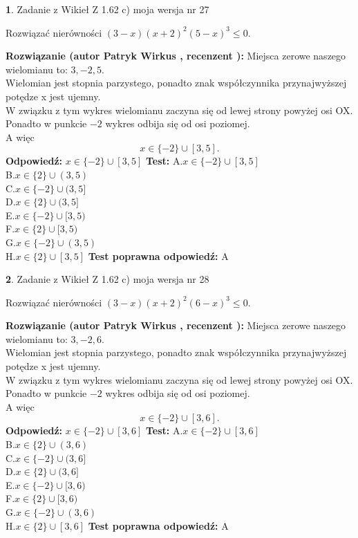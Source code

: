 \documentclass[12pt, a4paper]{article}
\theoremstyle{definition} %
\newtheorem{zad}{}
\newcommand{\zadStart}[1]{\begin{zad}#1\newline}
\newcommand{\zadStop}{\end{zad}}
\newcommand{\rozwStart}[2]{\noindent \textbf{Rozwiązanie (autor #1 , recenzent #2): }\newline}
\newcommand{\rozwStop}{\newline}
\newcommand{\odpStart}{\noindent \textbf{Odpowiedź:}\newline}
\newcommand{\odpStop}{\newline}
\newcommand{\testStart}{\noindent \textbf{Test:}\newline}
\newcommand{\testStop}{\newline}
\newcommand{\kluczStart}{\noindent \textbf{Test poprawna odpowiedź:}\newline}
\newcommand{\kluczStop}{\newline}
\begin{document}
\zadStart{Zadanie z Wikieł Z 1.62 c) moja wersja nr 27}

Rozwiązać nierówności $(3-x)(x+2)^{2}(5-x)^{3}\le0$.
\zadStop
\rozwStart{Patryk Wirkus}{}
Miejsca zerowe naszego wielomianu to: $3, -2, 5$.\\
Wielomian jest stopnia parzystego, ponadto znak współczynnika przy\linebreak najwyższej potędze x jest ujemny.\\ W związku z tym wykres wielomianu zaczyna się od lewej strony powyżej osi OX.\\
Ponadto w punkcie $-2$ wykres odbija się od osi poziomej.\\
A więc $$x \in \{-2\} \cup [3,5].$$
\rozwStop
\odpStart
$x \in \{-2\} \cup [3,5]$
\odpStop
\testStart
A.$x \in \{-2\} \cup [3,5]$\\
B.$x \in \{2\} \cup (3,5)$\\
C.$x \in \{-2\} \cup (3,5]$\\
D.$x \in \{2\} \cup (3,5]$\\
E.$x \in \{-2\} \cup [3,5)$\\
F.$x \in \{2\} \cup [3,5)$\\
G.$x \in \{-2\} \cup (3,5)$\\
H.$x \in \{2\} \cup [3,5]$
\testStop
\kluczStart
A
\kluczStop



\zadStart{Zadanie z Wikieł Z 1.62 c) moja wersja nr 28}

Rozwiązać nierówności $(3-x)(x+2)^{2}(6-x)^{3}\le0$.
\zadStop
\rozwStart{Patryk Wirkus}{}
Miejsca zerowe naszego wielomianu to: $3, -2, 6$.\\
Wielomian jest stopnia parzystego, ponadto znak współczynnika przy\linebreak najwyższej potędze x jest ujemny.\\ W związku z tym wykres wielomianu zaczyna się od lewej strony powyżej osi OX.\\
Ponadto w punkcie $-2$ wykres odbija się od osi poziomej.\\
A więc $$x \in \{-2\} \cup [3,6].$$
\rozwStop
\odpStart
$x \in \{-2\} \cup [3,6]$
\odpStop
\testStart
A.$x \in \{-2\} \cup [3,6]$\\
B.$x \in \{2\} \cup (3,6)$\\
C.$x \in \{-2\} \cup (3,6]$\\
D.$x \in \{2\} \cup (3,6]$\\
E.$x \in \{-2\} \cup [3,6)$\\
F.$x \in \{2\} \cup [3,6)$\\
G.$x \in \{-2\} \cup (3,6)$\\
H.$x \in \{2\} \cup [3,6]$
\testStop
\kluczStart
A
\kluczStop
\end{document}
